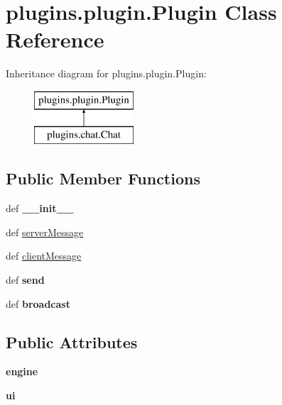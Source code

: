 \hypertarget{classplugins_1_1plugin_1_1_plugin}{\section{plugins.\-plugin.\-Plugin \-Class \-Reference}
\label{classplugins_1_1plugin_1_1_plugin}
}
\-Inheritance diagram for plugins.\-plugin.\-Plugin\-:\begin{figure}[H]
\begin{center}
\leavevmode
\includegraphics[height=2.000000cm]{classplugins_1_1plugin_1_1_plugin}
\end{center}
\end{figure}
\subsection*{\-Public \-Member \-Functions}
\begin{DoxyCompactItemize}
\item 
\hypertarget{classplugins_1_1plugin_1_1_plugin_a66f5c840ac03b9b724fb9734669abdfb}{def {\bfseries \-\_\-\-\_\-init\-\_\-\-\_\-}}\label{classplugins_1_1plugin_1_1_plugin_a66f5c840ac03b9b724fb9734669abdfb}

\item 
def \hyperlink{classplugins_1_1plugin_1_1_plugin_aac06ba69452a3dac4e5950116a34d3ac}{server\-Message}
\item 
def \hyperlink{classplugins_1_1plugin_1_1_plugin_a9647791e5ba3150f5fd82bb359a43d11}{client\-Message}
\item 
\hypertarget{classplugins_1_1plugin_1_1_plugin_a977c6c1cb7ea7cbb54667f8264da135c}{def {\bfseries send}}\label{classplugins_1_1plugin_1_1_plugin_a977c6c1cb7ea7cbb54667f8264da135c}

\item 
\hypertarget{classplugins_1_1plugin_1_1_plugin_a030ec3807307c32b09dc91b8f4d3ede9}{def {\bfseries broadcast}}\label{classplugins_1_1plugin_1_1_plugin_a030ec3807307c32b09dc91b8f4d3ede9}

\end{DoxyCompactItemize}
\subsection*{\-Public \-Attributes}
\begin{DoxyCompactItemize}
\item 
\hypertarget{classplugins_1_1plugin_1_1_plugin_a27cac3b42754566db40b9cb0109648b4}{{\bfseries engine}}\label{classplugins_1_1plugin_1_1_plugin_a27cac3b42754566db40b9cb0109648b4}

\item 
\hypertarget{classplugins_1_1plugin_1_1_plugin_aac6f72b7299d7727ad2e851fc49d7adb}{{\bfseries ui}}\label{classplugins_1_1plugin_1_1_plugin_aac6f72b7299d7727ad2e851fc49d7adb}

\end{DoxyCompactItemize}
